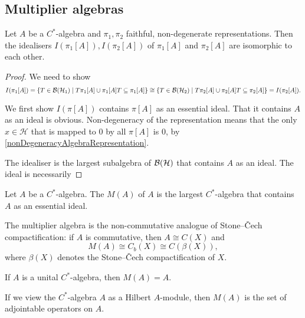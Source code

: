 \subsection{Multiplier algebras}
\begin{proposition}
Let $A$ be a $C^*$-algebra and $\pi_1, \pi_2$ faithful, non-degenerate representations. Then the idealisers $I(\pi_1[A]), I(\pi_2[A])$ of $\pi_1[A]$ and $\pi_2[A]$ are isomorphic to each other.
\end{proposition}
\begin{proof}
We need to show
\[ I(\pi_1[A]) = \left\{ T\in \operatorname{\mathcal{B}}(\mathcal{H}_1) \;\middle|\; T\pi_1[A] \cup \pi_1[A]T \subseteq \pi_1[A] \right\} \cong \left\{ T\in \operatorname{\mathcal{B}}(\mathcal{H}_2) \;\middle|\; T\pi_2[A] \cup \pi_2[A]T \subseteq \pi_2[A] \right\} = I(\pi_2[A]). \]

We first show $I(\pi[A])$ contains $\pi[A]$ as an essential ideal. That it contains $A$ as an ideal is obvious. Non-degeneracy of the representation means that the only $x\in\mathcal{H}$ that is mapped to $0$ by all $\pi[A]$ is $0$, by \ref{nonDegeneracyAlgebraRepresentation}. 

The idealiser is the largest subalgebra of $\operatorname{\mathcal{B}}(\mathcal{H})$ that contains $A$ as an ideal. The ideal is necessarily 
\end{proof}

\begin{definition}
Let $A$ be a $C^*$-algebra. The  $M(A)$ of $A$ is the largest $C^*$-algebra that contains $A$ as an essential ideal.
\end{definition}

The multiplier algebra is the non-commutative analogue of Stone–Čech compactification: if $A$ is commutative, then $A\cong C(X)$ and
\[ M(A) \cong C_b(X) \cong C(\beta(X)), \]
where $\beta(X)$ denotes the Stone–Čech compactification of $X$.

\begin{lemma}
If $A$ is a unital $C^*$-algebra, then $M(A) = A$.
\end{lemma}
If we view the $C^*$-algebra $A$ as a Hilbert $A$-module, then $M(A)$ is the set of adjointable operators on $A$.

